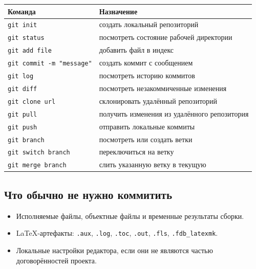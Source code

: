 \begin{center}
\begin{tabular}{l|p{9cm}}
Команда & Назначение \\
\hline
\texttt{git init} & создать локальный репозиторий \\
\texttt{git status} & посмотреть состояние рабочей директории \\
\texttt{git add file} & добавить файл в индекс \\
\texttt{git commit -m "message"} & создать коммит с сообщением \\
\texttt{git log} & посмотреть историю коммитов \\
\texttt{git diff} & посмотреть незакоммиченные изменения \\
\texttt{git clone url} & склонировать удалённый репозиторий \\
\texttt{git pull} & получить изменения из удалённого репозитория \\
\texttt{git push} & отправить локальные коммиты \\
\texttt{git branch} & посмотреть или создать ветки \\
\texttt{git switch branch} & переключиться на ветку \\
\texttt{git merge branch} & слить указанную ветку в текущую \\
\end{tabular}
\end{center}

\subsection*{Что обычно не нужно коммитить}
\begin{itemize}
    \item Исполняемые файлы, объектные файлы и временные результаты сборки.
    \item LaTeX-артефакты: \texttt{.aux}, \texttt{.log}, \texttt{.toc}, \texttt{.out}, \texttt{.fls}, \texttt{.fdb\_latexmk}.
    \item Локальные настройки редактора, если они не являются частью договорённостей проекта.
\end{itemize}
